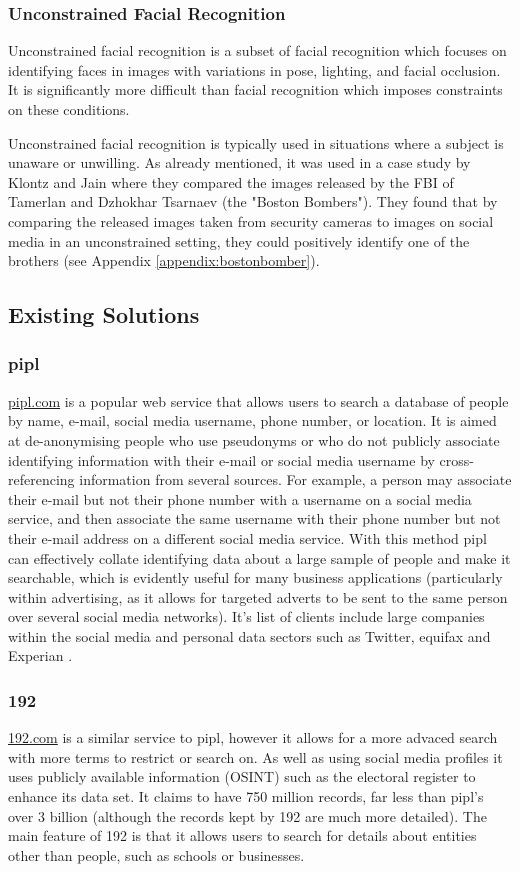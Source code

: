 \documentclass[12pt]{article}
\begin{document}
\subsubsection{Unconstrained Facial Recognition}
Unconstrained facial recognition is a subset of facial recognition which focuses on identifying faces in images with variations in pose, lighting, and facial occlusion. It is significantly more difficult than facial recognition which imposes constraints on these conditions.

Unconstrained facial recognition is typically used in situations where a subject is unaware or unwilling. As already mentioned, it was used in a case study by Klontz and Jain where they compared the images released by the FBI of Tamerlan and Dzhokhar Tsarnaev (the "Boston Bombers"). They found that by comparing the released images taken from security cameras to images on social media in an unconstrained setting, they could positively identify one of the brothers \citep{bostonbombingcasestudy} (see Appendix \ref{appendix:bostonbomber}).

\subsection{Existing Solutions}
\subsubsection{pipl}
\url{pipl.com} is a popular web service that allows users to search a database of people by name, e-mail, social media username, phone number, or location. It is aimed at de-anonymising people who use pseudonyms or who do not publicly associate identifying information with their e-mail or social media username by cross-referencing information from several sources. For example, a person may associate their e-mail but not their phone number with a username on a social media service, and then associate the same username with their phone number but not their e-mail address on a different social media service. With this method pipl can effectively collate identifying data about a large sample of people and make it searchable, which is evidently useful for many business applications (particularly within advertising, as it allows for targeted adverts to be sent to the same person over several social media networks). It's list of clients include large companies within the social media and personal data sectors such as Twitter, equifax and Experian \citep{pipl}.

\subsubsection{192}
\url{192.com} is a similar service to pipl, however it allows for a more advaced search with more terms to restrict or search on. As well as using social media profiles it uses publicly available information (OSINT) such as the electoral register to enhance its data set. It claims to have 750 million records, far less than pipl's over 3 billion (although the records kept by 192 are much more detailed). The main feature of 192 is that it allows users to search for details about entities other than people, such as schools or businesses.
\end{document}
